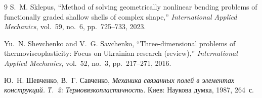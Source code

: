 \begin{thebibliography}{9}
S.~M. Sklepus,
``Method of solving geometrically nonlinear bending problems of functionally graded shallow shells of complex shape,''
\emph{International Applied Mechanics}, vol.~59, no.~6, pp.~725--733, 2023.

Yu.~N. Shevchenko and V.~G. Savchenko,
``Three-dimensional problems of thermoviscoplasticity: Focus on Ukrainian research (review),''
\emph{International Applied Mechanics}, vol.~52, no.~3, pp.~217--271, 2016.

Ю.~Н. Шевченко, В.~Г. Савченко,
\emph{Механика связанных полей в элементах конструкций. Т.~2: Термовязкопластичность}.
Киев: Наукова думка, 1987, 264~с.
\end{thebibliography}
